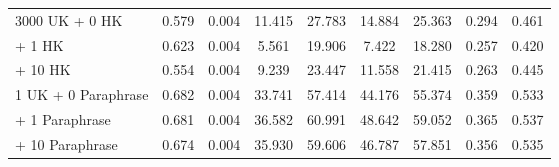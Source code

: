 \begin{table*}[!ht]
\begin{tabular}{l|cc|cccccc}
3000 UK \hspace{0.5ex} + \hspace{3.5ex} 0 HK   &                           0.579            &   0.004                                   &    11.415                               &        27.783                              &                        14.884              &          25.363                            &     0.294                                 &   0.461                                   \\
\hspace{9.3ex} + \hspace{3.5ex} 1 HK   &  0.623                                     &          0.004                            &      5.561                             &                       19.906               &    7.422                                  &    18.280                                  &         0.257                             &                     0.420                 \\
 \hspace{9.3ex} + \hspace{2.5ex} 10 HK   &   0.554 &         0.004    &          9.239  &          23.447     &           11.558     &    21.415      &         0.263      &      0.445     \\ \midrule
\hspace{2.5ex} 1 UK\hspace{1.3ex} + \hspace{1.5ex} 0 Paraphrase      &  0.682              &  0.004             &           33.741   &      57.414          &   44.176        &          55.374       &       0.359          &              0.533   \\
 \hspace{9.3ex} + \hspace{1.5ex} 1 Paraphrase    & 0.681                                 & 0.004                                & 36.582                            & 60.991                               & 48.642                               & 59.052                               & 0.365                                & 0.537                                \\
 \hspace{9.3ex} + \hspace{0.5ex} 10 Paraphrase    & 0.674                                 & 0.004                                & 35.930                            & 59.606                               & 46.787                               & 57.851                               & 0.356                                & 0.535                                \\

\end{tabular}
\end{table*}
